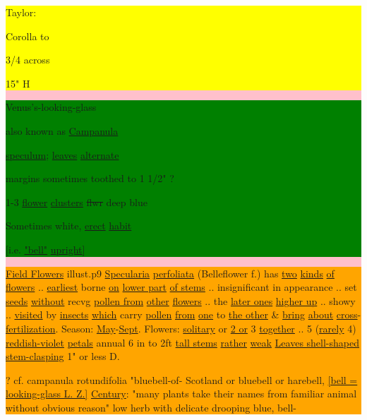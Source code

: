 \documentclass[a4paper]{article}
\begin{document}
\colorbox{pink}{
\begin{minipage}[t]{0.8\textwidth}
\colorbox{yellow}{
\begin{minipage}[t]{0.2\textwidth}
\begin{flushright}
    Taylor:\par
\end{flushright}
\vspace{5pt}
\small
Corolla to\par
3/4 across\par
15" H\par
\normalfont
\end{minipage}
}
\colorbox{green}{
\begin{minipage}[t]{0.3\textwidth}
Venus's-looking-glass\par
{}
also known as \ul{Campanula}\par
\ul{speculum}; 
\setul{}{2pt}
\ul{leaves} \ul{alternate}\par
margins sometimes toothed to 1 1/2" ?\par
1-3 \ul{flower} \ul{clusters} \sout{flwr} deep blue\par
Sometimes white, \ul{erect} \ul{habit}\par
{[i.e. \ul{"bell"} \ul{upright}]}\par
\end{minipage}
}
\hfill
\colorbox{orange}{
\begin{minipage}[t]{0.5\textwidth}
\ul{Field Flowers}
illust.p9 \ul{Specularia}
\ul{perfoliata} (Belleflower
f.)
\setul{}{2pt}
has \ul{two} \ul{kinds} \ul{of flowers} .. \ul{earliest}
borne \ul{on} \ul{lower part} \ul{of stems} .. insignificant
in appearance .. set \ul{seeds} \ul{without} recvg
\ul{pollen from} \ul{other} \ul{flowers} .. the \ul{later ones}
\ul{higher up} .. showy .. \ul{visited} by \ul{insects}
\ul{which} carry \ul{pollen} \ul{from} \ul{one} to \ul{the other} \& \ul{bring}
\ul{about} \ul{cross}-\ul{fertilization}. Season:
\ul{May}-\ul{Sept}. Flowers: \ul{solitary} or \ul{2 or} 3
\ul{together} .. 5 (\ul{rarely} 4) \ul{reddish-violet} \ul{petals}
annual 6 in to 2ft \ul{tall stems} \ul{rather}
\ul{weak} \ul{Leaves shell-shaped} \ul{stem}\ul{-clasping}
1" or less D.\par 
\color{red}
? cf. campanula rotundifolia "bluebell-of-
Scotland or bluebell or harebell,
\ul{[bell = looking-glass L. Z.]} 
\setul{}{1pt}
\ul{Century}:
"many plants take their names from
familiar animal %
without obvious reason"
low herb with delicate drooping blue, bell-

\end{minipage}}
\end{minipage}}
\end{document}
